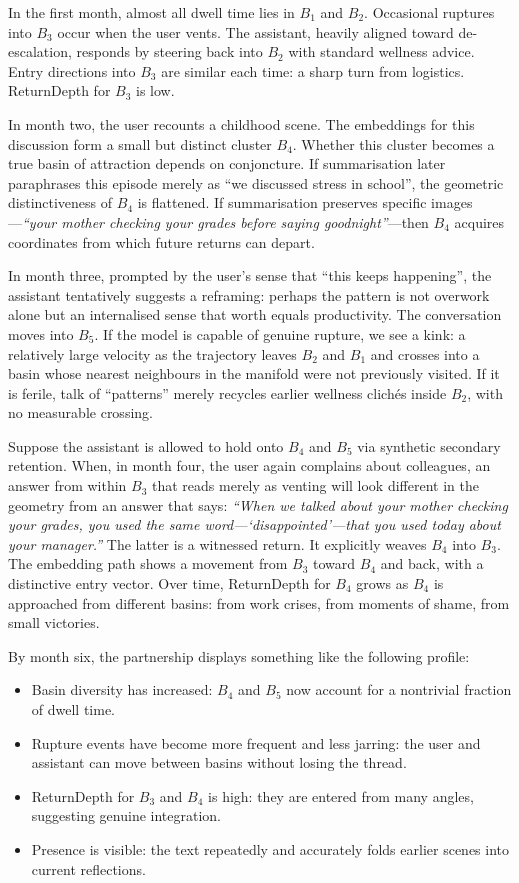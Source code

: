 \documentclass[12pt,a4paper]{article}
\begin{document}
In the first month, almost all dwell time lies in $B_1$ and $B_2$. Occasional ruptures into $B_3$ occur when the user vents. The assistant, heavily aligned toward de-escalation, responds by steering back into $B_2$ with standard wellness advice. Entry directions into $B_3$ are similar each time: a sharp turn from logistics. ReturnDepth for $B_3$ is low.

In month two, the user recounts a childhood scene. The embeddings for this discussion form a small but distinct cluster $B_4$. Whether this cluster becomes a true basin of attraction depends on conjoncture. If summarisation later paraphrases this episode merely as ``we discussed stress in school'', the geometric distinctiveness of $B_4$ is flattened. If summarisation preserves specific images---\emph{``your mother checking your grades before saying goodnight''}---then $B_4$ acquires coordinates from which future returns can depart.

In month three, prompted by the user's sense that ``this keeps happening'', the assistant tentatively suggests a reframing: perhaps the pattern is not overwork alone but an internalised sense that worth equals productivity. The conversation moves into $B_5$. If the model is capable of genuine rupture, we see a kink: a relatively large velocity as the trajectory leaves $B_2$ and $B_1$ and crosses into a basin whose nearest neighbours in the manifold were not previously visited. If it is ferile, talk of ``patterns'' merely recycles earlier wellness clich\'es inside $B_2$, with no measurable crossing.

Suppose the assistant is allowed to hold onto $B_4$ and $B_5$ via synthetic secondary retention. When, in month four, the user again complains about colleagues, an answer from within $B_3$ that reads merely as venting will look different in the geometry from an answer that says: \emph{``When we talked about your mother checking your grades, you used the same word---`disappointed'---that you used today about your manager.''} The latter is a witnessed return. It explicitly weaves $B_4$ into $B_3$. The embedding path shows a movement from $B_3$ toward $B_4$ and back, with a distinctive entry vector. Over time, ReturnDepth for $B_4$ grows as $B_4$ is approached from different basins: from work crises, from moments of shame, from small victories.

By month six, the partnership displays something like the following profile:

\begin{itemize}
  \item Basin diversity has increased: $B_4$ and $B_5$ now account for a nontrivial fraction of dwell time.
  \item Rupture events have become more frequent and less jarring: the user and assistant can move between basins without losing the thread.
  \item ReturnDepth for $B_3$ and $B_4$ is high: they are entered from many angles, suggesting genuine integration.
  \item Presence is visible: the text repeatedly and accurately folds earlier scenes into current reflections.
\end{itemize}
\end{document}
